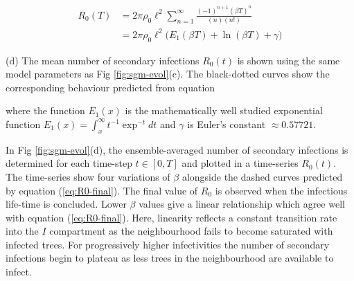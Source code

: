 \begin{equation} \label{eq:Appendix_final_expression}
\begin{split}
R_0(T) & = 2\pi\rho_0 \ell^2 \sum^{\infty}_{n=1} \frac{(-1)^{n+1} (\beta T)^n}{(n)(n!)}\\
& =  2\pi\rho_0 \ell^2 \big(E_1(\beta T) + \ln (\beta T) + \gamma\big)
\end{split}
\end{equation}


(d) The mean number of secondary infections $R_0(t)$ is shown using the same model parameters as Fig \ref{fig:sgm-evol}(c). The black-dotted curves show the corresponding behaviour predicted from equation

where the function $E_1(x)$ is the mathematically well studied exponential function $E_1(x)=\int^{\infty}_x t^{-1}\exp^{-t}dt$ and $\gamma$ is Euler's constant $\approx 0.57721$.


In Fig \ref{fig:sgm-evol}(d), the ensemble-averaged number of secondary infections is determined for each time-step $t\in [0, T]$ and plotted in a time-series $R_0(t)$. The time-series show four variations of $\beta$ alongside the dashed curves predicted by equation (\ref{eq:R0-final}). The final value of $R_0$ is observed when the infectious life-time is concluded. Lower $\beta$ values give a linear relationship which agree well with equation (\ref{eq:R0-final}). Here, linearity reflects a constant transition rate into the $I$ compartment as the neighbourhood fails to become saturated with infected trees. For progressively higher infectivities the number of secondary infections begin to plateau as less trees in the neighbourhood are available to infect.\\

